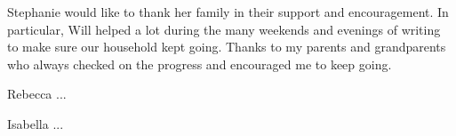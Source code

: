 
\thispagestyle{empty}

\begin{center}
Stephanie would like to thank her family in their support and encouragement. In particular, Will helped a lot during the many weekends and evenings of writing to make sure our household kept going. Thanks to my parents and grandparents who always checked on the progress and encouraged me to keep going.

Rebecca ...

Isabella ...
\end{center}

\setlength{\abovedisplayskip}{-5pt}
\setlength{\abovedisplayshortskip}{-5pt}
